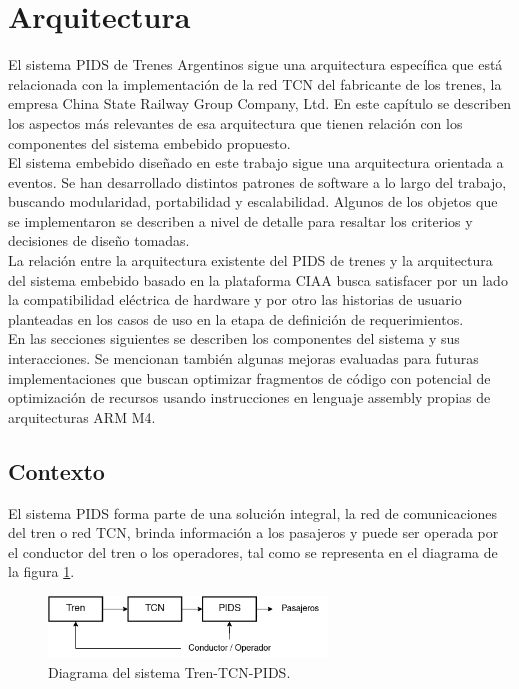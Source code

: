 \pagebreak

\section{Arquitectura}

El sistema PIDS de Trenes Argentinos sigue una arquitectura específica que está relacionada con la implementación de la red TCN del fabricante de los trenes, la empresa China State Railway Group Company, Ltd. En este capítulo se describen los aspectos más relevantes de esa arquitectura que tienen relación con los componentes del sistema embebido propuesto.\\

El sistema embebido diseñado en este trabajo sigue una arquitectura orientada a eventos. Se han desarrollado distintos patrones de software a lo largo del trabajo, buscando modularidad, portabilidad y escalabilidad. Algunos de los objetos que se implementaron se describen a nivel de detalle para resaltar los criterios y decisiones de diseño tomadas. \\

La relación entre la arquitectura existente del PIDS de trenes y la arquitectura del sistema embebido basado en la plataforma CIAA busca satisfacer por un lado la compatibilidad eléctrica de hardware y por otro las historias de usuario planteadas en los casos de uso en la etapa de definición de requerimientos. \\

En las secciones siguientes se describen los componentes del sistema y sus interacciones. Se mencionan también algunas mejoras evaluadas para futuras implementaciones que buscan optimizar fragmentos de código con potencial de optimización de recursos usando instrucciones en lenguaje assembly propias de arquitecturas ARM M4.\\

\subsection{Contexto}

El sistema PIDS forma parte de una solución integral, la red de comunicaciones del tren o red TCN, brinda información a los pasajeros y puede ser operada por el conductor del tren o los operadores, tal como se representa en el diagrama de la figura \ref{fig:diagTrenTcnPids}.\\

\begin{figure}[ht]
	\centering
	\includegraphics[width=0.66\textwidth]{./Figures/diagTrenTcnPids.png}
	\caption{Diagrama del sistema Tren-TCN-PIDS.}
	\label{fig:diagTrenTcnPids}
\end{figure}

